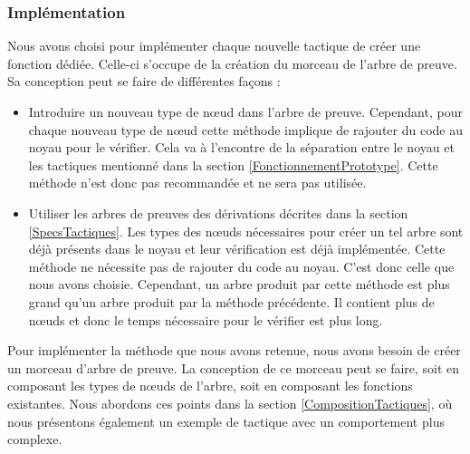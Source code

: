 \documentclass[titlepage,draft]{article}
\begin{document}
\subsubsection{Implémentation}
Nous avons choisi pour implémenter chaque nouvelle tactique de créer une fonction dédiée. Celle-ci s'occupe de la création du morceau de l'arbre de preuve. Sa conception peut se faire de différentes façons :
\begin{itemize}
    \item Introduire un nouveau type de nœud dans l'arbre de preuve. Cependant, pour chaque nouveau type de nœud cette méthode implique de rajouter du code au noyau pour le vérifier. Cela va à l'encontre de la séparation entre le noyau et les tactiques mentionné dans la section \ref{FonctionnementPrototype}. Cette méthode n'est donc pas recommandée et ne sera pas utilisée.
    \item Utiliser les arbres de preuves des dérivations décrites dans la section \ref{SpecsTactiques}. Les types des nœuds nécessaires pour créer un tel arbre sont déjà présents dans le noyau et leur vérification est déjà implémentée. Cette méthode ne nécessite pas de rajouter du code au noyau. C'est donc celle que nous avons choisie. Cependant, un arbre produit par cette méthode est plus grand qu'un arbre produit par la méthode précédente. Il contient plus de nœuds et donc le temps nécessaire pour le vérifier est plus long.
\end{itemize}
Pour implémenter la méthode que nous avons retenue, nous avons besoin de créer un morceau d'arbre de preuve. La conception de ce morceau peut se faire, soit en composant les types de nœuds de l'arbre, soit en composant les fonctions existantes. Nous abordons ces points dans la section \ref{CompositionTactiques}, où nous présentons également un exemple de tactique avec un comportement plus complexe.
\end{document}
